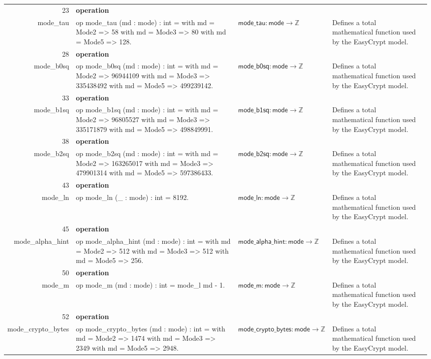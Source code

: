 \documentclass[10pt]{article}
\newcommand{\ec}[1]{\begingroup\ttfamily\scriptsize #1\endgroup}
\begin{document}
\begin{longtable}{r L{0.17\textwidth} L{0.26\textwidth} L{0.27\textwidth} L{0.20\textwidth}}
23 & \textbf{operation}\\\ec{mode\_tau} & \ec{op mode\_tau (md : mode) : int = with md = Mode2 => 58 with md = Mode3 => 80 with md = Mode5 => 128.} & \(\mathsf{mode\_tau} : \mathsf{mode} \to \mathbb{Z}\) & Defines a total mathematical function used by the EasyCrypt model. \\
28 & \textbf{operation}\\\ec{mode\_b0sq} & \ec{op mode\_b0sq (md : mode) : int = with md = Mode2 => 96944109 with md = Mode3 => 335438492 with md = Mode5 => 499239142.} & \(\mathsf{mode\_b0sq} : \mathsf{mode} \to \mathbb{Z}\) & Defines a total mathematical function used by the EasyCrypt model. \\
33 & \textbf{operation}\\\ec{mode\_b1sq} & \ec{op mode\_b1sq (md : mode) : int = with md = Mode2 => 96805527 with md = Mode3 => 335171879 with md = Mode5 => 498849991.} & \(\mathsf{mode\_b1sq} : \mathsf{mode} \to \mathbb{Z}\) & Defines a total mathematical function used by the EasyCrypt model. \\
38 & \textbf{operation}\\\ec{mode\_b2sq} & \ec{op mode\_b2sq (md : mode) : int = with md = Mode2 => 163265017 with md = Mode3 => 479901314 with md = Mode5 => 597386433.} & \(\mathsf{mode\_b2sq} : \mathsf{mode} \to \mathbb{Z}\) & Defines a total mathematical function used by the EasyCrypt model. \\
43 & \textbf{operation}\\\ec{mode\_ln} & \ec{op mode\_ln (\_ : mode) : int = 8192.} & \(\mathsf{mode\_ln} : \mathsf{mode} \to \mathbb{Z}\) & Defines a total mathematical function used by the EasyCrypt model. \\
45 & \textbf{operation}\\\ec{mode\_alpha\_hint} & \ec{op mode\_alpha\_hint (md : mode) : int = with md = Mode2 => 512 with md = Mode3 => 512 with md = Mode5 => 256.} & \(\mathsf{mode\_alpha\_hint} : \mathsf{mode} \to \mathbb{Z}\) & Defines a total mathematical function used by the EasyCrypt model. \\
50 & \textbf{operation}\\\ec{mode\_m} & \ec{op mode\_m (md : mode) : int = mode\_l md - 1.} & \(\mathsf{mode\_m} : \mathsf{mode} \to \mathbb{Z}\) & Defines a total mathematical function used by the EasyCrypt model. \\
52 & \textbf{operation}\\\ec{mode\_crypto\_bytes} & \ec{op mode\_crypto\_bytes (md : mode) : int = with md = Mode2 => 1474 with md = Mode3 => 2349 with md = Mode5 => 2948.} & \(\mathsf{mode\_crypto\_bytes} : \mathsf{mode} \to \mathbb{Z}\) & Defines a total mathematical function used by the EasyCrypt model. \\

\end{longtable}
\end{document}

